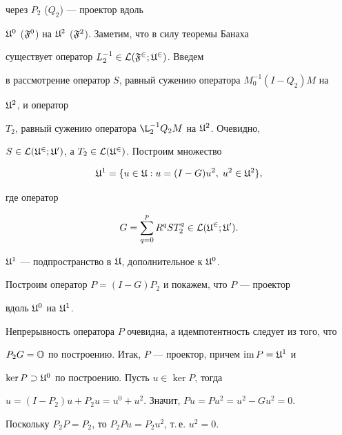 через $P_2$ ($Q_2$) --- проектор вдоль 


$\frak U^0$ ($\frak F^0$) на $\frak U^2$ ($\frak F^2$). Заметим, что в силу теоремы Банаха 


существует оператор $L_2^{-1}\in\cal L(\frak F^2;\frak U^2)$. Введем 


в рассмотрение оператор $S$, равный сужению оператора $M_0^{-1}(I-Q_2)M$ на 


$\frak U^2$, и оператор 


$T_2$, равный сужению оператора $\L_2^{-1}Q_2M$ на $\frak U^2$. Очевидно, 


$S\in\cal L(\frak U^2;\frak U^0)$, а $T_2\in\cal L(\frak U^2)$. Построим множество 


$$ 


\fu^1=\{u\in\fu:u=(I-G)u^2,\;u^2\in\fu^2\}, 


$$ 


где оператор 


$$ 


G=\sum^p_{q=0}R^qST_2^q\in\lc(\fu^2;\fu^0). 


$$ 


 




\begin{lems} $\frak U^1$ --- подпространство в $\frak U$, дополнительное к $\frak U^0$. 


\end{lems} 


 


\begin{pf} Построим оператор $P=(I-G)P_2$ и покажем, что $P$ --- проектор 


вдоль $\frak U^0$ на $\frak U^1$. 


 


Непрерывность оператора $P$ очевидна, а идемпотентность следует из того, что 


$P_2G=\Bbb O$ по построению. Итак, $P$ --- проектор, причем $\operatorname{im} P=\frak U^1$ и 


$\ker P\supset \frak U^0$ по построению. Пусть $u\in\ker P$, тогда 


$u=(I-P_2)u+P_2u=u^0+u^2$. Значит, $Pu=Pu^2=u^2-Gu^2=0$. 


Поскольку $P_2P=P_2$, то $P_2Pu=P_2u^2$, т.\,е. $u^2=0$. 


\end{pf} 


 


